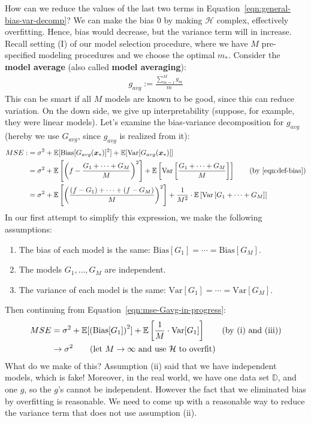 \documentclass[12pt, a4paper]{article}
\theoremstyle{definition}
\begin{document}
	How can we reduce the values of the last two terms in
	Equation~\ref{eqn:general-bias-var-decomp}? We can make the bias $0$ by
	making $\mathcal{H}$ complex, effectively overfitting. Hence, bias would
	decrease, but the variance term will in increase. Recall setting (I) of our
	model selection procedure, where we have $M$ pre-specified modeling procedures
	and we choose the optimal $m_*$. Consider the \textbf{model average}
	(also called \textbf{model averaging}):
	\begin{align*}
		g_{avg} := \frac{\sum_{m=1}^{M}g_m}{m}
	\end{align*}
	This can be smart if all $M$ models are known to be good, since this can
	reduce variation. On the down side, we give up interpretability (suppose,
	for example, they were linear models). Let's examine the bias-variance decomposition
	for $g_{avg}$ (hereby we use $G_{avg}$, since $g_{avg}$ is realized from it):
	\begin{align}
		MSE :
		&= \sigma^2 + \mathbb{E}[\text{Bias}[G_{avg}(\bm{x}_*)]^2]
		+\mathbb{E}[\text{Var}[G_{avg}(\bm{x}_{*})]]\nonumber\\
		&= \sigma^2 + \mathbb{E}\left[
			\left(
				f - \frac{G_1 + \cdots + G_M}{M} 
			\right)^2
		\right]
		+ \mathbb{E}\left[\text{Var}\left[\frac{G_1 + \cdots + G_M}{M}\right]\right]
		\tag{by \ref{eqn:def-bias}}
		\nonumber\\
		&= \sigma^2 + \mathbb{E}\left[
			\left(\frac{(f - G_1) + \cdots + (f - G_M)}{M}\right)^2
		\right]
		+ \frac{1}{M^2}\cdot \mathbb{E}\left[\text{Var}\left[G_1 + \cdots + G_M \right]\right]
		\label{eqn:mse-Gavg-in-progress}
	\end{align}
	In our first attempt to simplify this expression, we make the following assumptions:
	\begin{enumerate}[label=(\roman*)]
		\item The bias of each model is the same: $\text{Bias}[G_1]=\cdots=\text{Bias}[G_M]$.
		\item The models $G_1,\ldots,G_M$ are independent.
		\item The variance of each model is the same:
		$\text{Var}[G_1] = \cdots = \text{Var}[G_M]$.
	\end{enumerate}
	Then continuing from Equation~\ref{eqn:mse-Gavg-in-progress}:
	\begin{align*}
		MSE &=\sigma^2 + \mathbb{E}[\left(\text{Bias}[G_1]\right)^2]
		+\mathbb{E}\left[
		\frac{1}{M}\cdot \text{Var}[G_1]
		\right]
		\tag{by (i) and (iii)}\\
		&\to \sigma^2
		\tag{let $M\to\infty$ and use $\mathcal{H}$ to overfit}
	\end{align*}
	What do we make of this? Assumption (ii) said that we have independent models,
	which is fake! Moreover, in the real world, we have one data set $\mathbb{D}$,
	and one $g$, so the $g$'s cannot be independent. However the fact that we
	eliminated bias by overfitting is reasonable. We need to come up with a
	reasonable way to reduce the variance term that does not use assumption (ii).
\end{document}
